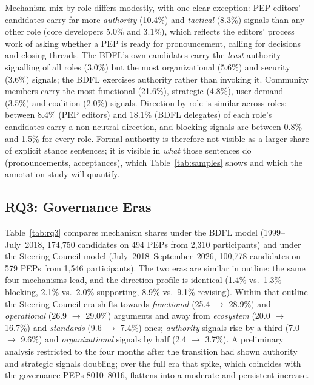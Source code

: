\documentclass[sigconf,screen]{acmart}
\begin{document}
Mechanism mix by role differs modestly, with one clear exception: PEP editors' candidates carry far more \emph{authority} (10.4\%) and \emph{tactical} (8.3\%) signals than any other role (core developers 5.0\% and 3.1\%), which reflects the editors' process work of asking whether a PEP is ready for pronouncement, calling for decisions and closing threads. The BDFL's own candidates carry the \emph{least} authority signalling of all roles (3.0\%) but the most organizational (5.6\%) and security (3.6\%) signals; the BDFL exercises authority rather than invoking it. Community members carry the most functional (21.6\%), strategic (4.8\%), user-demand (3.5\%) and coalition (2.0\%) signals. Direction by role is similar across roles: between 8.4\% (PEP editors) and 18.1\% (BDFL delegates) of each role's candidates carry a non-neutral direction, and blocking signals are between 0.8\% and 1.5\% for every role. Formal authority is therefore not visible as a larger share of explicit stance sentences; it is visible in \emph{what} those sentences do (pronouncements, acceptances), which Table~\ref{tab:samples} shows and which the annotation study will quantify.

\subsection{RQ3: Governance Eras}

Table~\ref{tab:rq3} compares mechanism shares under the BDFL model (1999--July~2018, 174,750 candidates on 494 PEPs from 2,310 participants) and under the Steering Council model (July~2018--September~2026, 100,778 candidates on 579 PEPs from 1,546 participants). The two eras are similar in outline: the same four mechanisms lead, and the direction profile is identical (1.4\% vs.\ 1.3\% blocking, 2.1\% vs.\ 2.0\% supporting, 8.9\% vs.\ 9.1\% revising). Within that outline the Steering Council era shifts towards \emph{functional} (25.4 $\rightarrow$ 28.9\%) and \emph{operational} (26.9 $\rightarrow$ 29.0\%) arguments and away from \emph{ecosystem} (20.0 $\rightarrow$ 16.7\%) and \emph{standards} (9.6 $\rightarrow$ 7.4\%) ones; \emph{authority} signals rise by a third (7.0 $\rightarrow$ 9.6\%) and \emph{organizational} signals by half (2.4 $\rightarrow$ 3.7\%). A preliminary analysis restricted to the four months after the transition had shown authority and strategic signals doubling; over the full era that spike, which coincides with the governance PEPs 8010--8016, flattens into a moderate and persistent increase.
\end{document}
